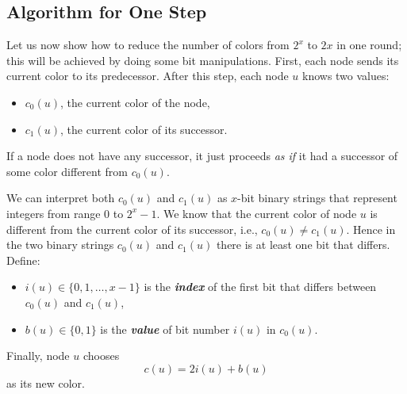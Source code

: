 \subsection{Algorithm for One Step}\label{ssec:fast-color-red-one-step}

Let us now show how to reduce the number of colors from $2^x$ to $2x$ in one round; this will be achieved by doing some bit manipulations. First, each node sends its current color to its predecessor. After this step, each node $u$ knows two values:
\begin{itemize}[noitemsep]
    \item $c_0(u)$, the current color of the node,
    \item $c_1(u)$, the current color of its successor.
\end{itemize}
If a node does not have any successor, it just proceeds \emph{as if} it had a successor of some color different from $c_0(u)$.

We can interpret both $c_0(u)$ and $c_1(u)$ as $x$-bit binary strings that represent integers from range $0$ to $2^x-1$. We know that the current color of node $u$ is different from the current color of its successor, i.e., $c_0(u) \ne c_1(u)$. Hence in the two binary strings $c_0(u)$ and $c_1(u)$ there is at least one bit that differs. Define:
\begin{itemize}
    \item $i(u) \in \{0,1,\dotsc,x-1\}$ is the \emph{\textbf{index}} of the first bit that differs between $c_0(u)$ and $c_1(u)$,
    \item $b(u) \in \{0,1\}$ is the \emph{\textbf{value}} of bit number $i(u)$ in $c_0(u)$.
\end{itemize}
Finally, node $u$ chooses
\[
    c(u) = 2i(u) + b(u)
\]
as its new color.


